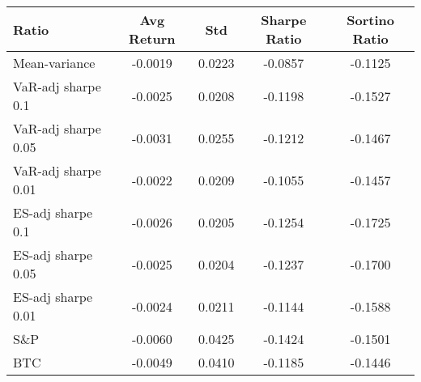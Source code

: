 \begin{tabular}{lcccc}
\toprule
Ratio & Avg Return & Std & Sharpe Ratio & Sortino Ratio\\
\midrule
Mean-variance & -0.0019 & 0.0223 & -0.0857 & -0.1125\\
VaR-adj sharpe 0.1 & -0.0025 & 0.0208 & -0.1198 & -0.1527\\
VaR-adj sharpe 0.05 & -0.0031 & 0.0255 & -0.1212 & -0.1467\\
VaR-adj sharpe 0.01 & -0.0022 & 0.0209 & -0.1055 & -0.1457\\
ES-adj sharpe 0.1 & -0.0026 & 0.0205 & -0.1254 & -0.1725\\
ES-adj sharpe 0.05 & -0.0025 & 0.0204 & -0.1237 & -0.1700\\
ES-adj sharpe 0.01 & -0.0024 & 0.0211 & -0.1144 & -0.1588\\
S\&P & -0.0060 & 0.0425 & -0.1424 & -0.1501\\
BTC & -0.0049 & 0.0410 & -0.1185 & -0.1446\\
\bottomrule
\end{tabular}
